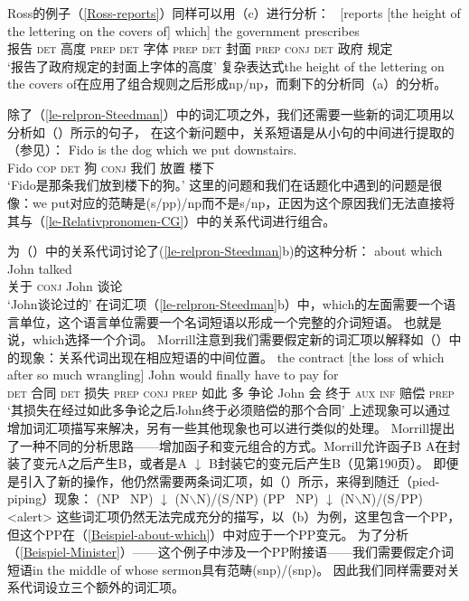 Ross的例子（\ref{Ross-reports}）同样可以用（c）进行分析：
\ea
\gll ~[reports [the height of the lettering on the covers of]
which] the government prescribes\\
报告 \textsc{det} 高度 \textsc{prep} \textsc{det} 字体 \textsc{prep} \textsc{det} 封面 \textsc{prep} \textsc{conj} \textsc{det} 政府 规定\\
\glt `报告了政府规定的封面上字体的高度'
\z
复杂表达式the height of the lettering on the covers of在应用了组合规则之后形成np/np，而剩下的分析同（a）的分析。

除了（\ref{le-relpron-Steedman}）中的词汇项之外，我们还需要一些新的词汇项用以分析如（）所示的句子，
在这个新问题中，关系短语是从小句的中间进行提取的（参见\citealp[]{Pollard88a}）：
\ea
\gll Fido is the dog which we put downstairs. \\
     Fido \textsc{cop} \textsc{det} 狗 \textsc{conj} 我们 放置 楼下 \\
\glt `Fido是那条我们放到楼下的狗。'
\z
这里的问题和我们在话题化中遇到的问题是很像：we put对应的范畴是(s/pp)/np而不是s/np，正因为这个原因我们无法直接将其与（\ref{le-Relativpronomen-CG}）中的关系代词进行组合。
\pagebreak

\citet[]{Morrill95a}为（）中的关系代词讨论了(\ref{le-relpron-Steedman}b)的这种分析：
\ea
\label{Beispiel-about-which}
\gll about which John talked \\
     关于 \textsc{conj} John 谈论 \\
\glt `John谈论过的'
\z
在词汇项（\ref{le-relpron-Steedman}b）中，which的左面需要一个语言单位，这个语言单位需要一个名词短语以形成一个完整的介词短语。
也就是说，which选择一个介词。
Morrill注意到我们需要假定新的词汇项以解释如（）中的现象：关系代词出现在相应短语的中间位置。
\ea
\gll the contract [the loss of which after so much wrangling] John would finally have to pay for \\
     \textsc{det} 合同 \textsc{det} 损失 \textsc{prep} \textsc{conj} \textsc{prep} 如此 多 争论 John 会 终于 \textsc{aux} \textsc{inf} 赔偿 \textsc{prep}\\
\glt `其损失在经过如此多争论之后John终于必须赔偿的那个合同'
\z
上述现象可以通过增加词汇项描写来解决，另有一些其他现象也可以进行类似的处理。
Morrill提出了一种不同的分析思路——增加函子和变元组合的方式。Morrill允许函子B \up
\isc{$\uparrow$}\is{$\uparrow$} A在封装了变元A之后产生B，或者是A $\downarrow$
\isc{$\downarrow$}\is{$\downarrow$} B封装它的变元后产生B（见第190页）。
即便是引入了新的操作，他仍然需要两条词汇项，如（）所示，来得到随迁（pied-piping）现象：
\eal
\ex (NP \up\ NP) $\downarrow$ (N$\backslash$N)/(S/NP)
\ex (PP \up\ NP) $\downarrow$ (N$\backslash$N)/(S/PP)
\zl
<alert>
这些词汇项仍然无法完成充分的描写，以（b）为例，这里包含一个PP，但这个PP在（\ref{Beispiel-about-which}）中对应于一个PP变元。 
为了分析（\ref{Beispiel-Minister}）——这个例子中涉及一个PP附接语——我们需要假定介词短语in the middle of whose sermon具有范畴(s\bs np)/(s\bs np)。
因此我们同样需要对关系代词设立三个额外的词汇项。

